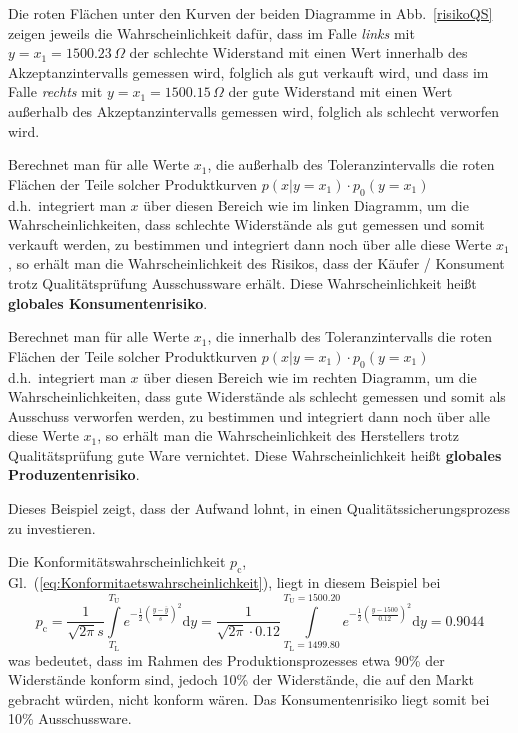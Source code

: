 Die roten Flächen unter den Kurven der beiden Diagramme in Abb.~\ref{risikoQS}
zeigen jeweils die Wahrscheinlichkeit dafür, dass im Falle \textsl{links} mit
$y = x_1 = 1500.23 \, \Omega$ der schlechte Widerstand mit einen Wert innerhalb des
Akzeptanzintervalls gemessen wird, folglich als gut verkauft wird, und dass im Falle \textsl{rechts} mit
$y = x_1 = 1500.15 \, \Omega$ der gute Widerstand mit einen Wert außerhalb des
Akzeptanzintervalls gemessen wird, folglich als schlecht verworfen wird.

Berechnet man für alle Werte $x_1$, die außerhalb des Toleranzintervalls die roten
Flächen der Teile solcher Produktkurven $p(x | y=x_1) \cdot p_0(y=x_1)$ d.h.\ integriert
man $x$ über diesen Bereich wie im linken Diagramm,
 um die Wahrscheinlichkeiten, dass schlechte Widerstände als gut
gemessen und somit verkauft werden, zu bestimmen und integriert dann noch
über alle diese Werte $x_1$, so erhält man die Wahrscheinlichkeit des Risikos, dass
der Käufer / Konsument  trotz Qualitätsprüfung Ausschussware erhält. Diese
Wahrscheinlichkeit heißt \textbf{globales Konsumentenrisiko}.

Berechnet man für alle Werte $x_1$, die innerhalb des Toleranzintervalls die roten
Flächen der Teile solcher Produktkurven $p(x | y=x_1) \cdot p_0(y=x_1)$ d.h.\ integriert
man $x$ über diesen Bereich wie im rechten Diagramm,
 um die Wahrscheinlichkeiten, dass gute Widerstände als schlecht
gemessen und somit als Ausschuss verworfen werden, zu bestimmen und integriert dann noch
über alle diese Werte $x_1$, so erhält man die Wahrscheinlichkeit des Herstellers
trotz Qualitätsprüfung gute Ware vernichtet. Diese
Wahrscheinlichkeit heißt \textbf{globales Produzentenrisiko}.

Dieses Beispiel zeigt, dass der Aufwand lohnt, in einen Qualitätssicherungsprozess zu investieren.

Die Konformitätswahrscheinlichkeit $p_\mathrm{c}$, Gl.~(\ref{eq:Konformitaetswahrscheinlichkeit}), liegt in diesem Beispiel bei
\[
	p_\mathrm{c} = \frac{1}{\sqrt{2 \pi} s} \int\limits_{T_\mathrm{L}}^{T_\mathrm{U}}
e^{-\frac{1}{2}\left(\frac{y - \bar y}{s}\right)^2} \mathrm{d}y  =
\frac{1}{\sqrt{2 \pi} \cdot 0.12} \int\limits_{T_\mathrm{L}=1499.80}^{T_\mathrm{U}=1500.20}
e^{-\frac{1}{2}\left(\frac{y - 1500}{0.12}\right)^2} \mathrm{d}y  = 0.9044
\]
was bedeutet, dass im Rahmen des Produktionsprozesses etwa 90\% der Widerstände konform sind,
jedoch 10\% der Widerstände, die auf den Markt gebracht würden, nicht konform wären. Das Konsumentenrisiko
liegt somit bei 10\% Ausschussware.

